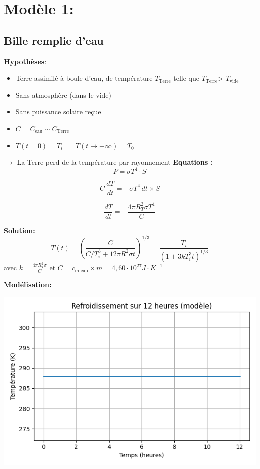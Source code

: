\documentclass[a4paper,12pt]{article}
\begin{document}
\section{Modèle 1:}
\subsection{Bille remplie d'eau}
\textbf{Hypothèses}:
\begin{itemize}
    \item Terre assimilé à boule d'eau, de température \(T_{\text{Terre}}\) telle que \(T_{\text{Terre}}\)> \(T_{\text{vide}}\)
    \item  Sans atmosphère (dans le vide)
    \item  Sans puissance solaire reçue  
    \item \(C= C_{\text{eau}} \sim C_{\text{Terre}}\) 
    \item $T(t=0) = T_i$ \ \ \
$T(t \to +\infty) = T_0$
   
\end{itemize}
$\rightarrow$ La Terre perd de la température par rayonnement
\textbf{Equations :} 
\[   P= \sigma T^4 \cdot S 
\]

\[    C \, \frac{dT}{dt} = - \sigma T^4 \, dt \times S
\]

\[\frac{dT}{dt} = - \frac{4 \pi R_T^2 \sigma T^4}{C}\]  

\textbf{Solution:} 
\[
T(t) = \left( \frac{C}{C/T_i^3 + 12\pi R^2 \sigma t} \right)^{1/3} 
= \frac{T_i}{\left(1 + 3k T_i^3 t \right)^{1/3}}
\]
avec \(k=\frac{4\pi R_T^2 \sigma}{C}\)
et \(C=c_{\text{m eau}}\times m=4,60 \cdot 10^{27} J\cdot K^{-1}\)

\bigskip



\bigskip
\textbf{Modélisation:} 
    
    \includegraphics[width=0.8\linewidth]{../modele1/figures/modele1.png}
\\
\end{document}
